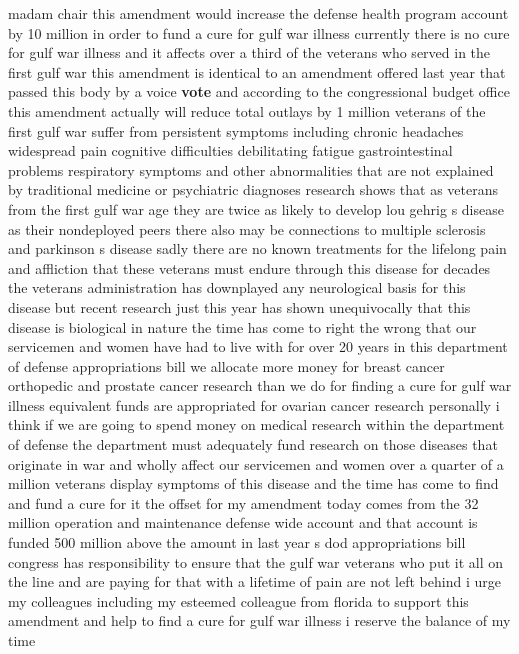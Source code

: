 \documentclass{article}
\begin{document}
\vspace{8mm}
madam chair this amendment would increase the defense health program account by 10 million in order to fund a cure for gulf war illness currently there is no cure for gulf war illness and it affects over a third of the veterans who served in the first gulf war this amendment is identical to an amendment offered last year that passed this body by a voice {\bf \color{red} vote} and according to the congressional budget office this amendment actually will reduce total outlays by 1 million veterans of the first gulf war suffer from persistent symptoms including chronic headaches widespread pain cognitive difficulties debilitating fatigue gastrointestinal problems respiratory symptoms and other abnormalities that are not explained by traditional medicine or psychiatric diagnoses research shows that as veterans from the first gulf war age they are twice as likely to develop lou gehrig s disease as their nondeployed peers there also may be connections to multiple sclerosis and parkinson s disease sadly there are no known treatments for the lifelong pain and affliction that these veterans must endure through this disease for decades the veterans administration has downplayed any neurological basis for this disease but recent research just this year has shown unequivocally that this disease is biological in nature the time has come to right the wrong that our servicemen and women have had to live with for over 20 years in this department of defense appropriations bill we allocate more money for breast cancer orthopedic and prostate cancer research than we do for finding a cure for gulf war illness equivalent funds are appropriated for ovarian cancer research personally i think if we are going to spend money on medical research within the department of defense the department must adequately fund research on those diseases that originate in war and wholly affect our servicemen and women over a quarter of a million veterans display symptoms of this disease and the time has come to find and fund a cure for it the offset for my amendment today comes from the 32 million operation and maintenance defense wide account and that account is funded 500 million above the amount in last year s dod appropriations bill congress has responsibility to ensure that the gulf war veterans who put it all on the line and are paying for that with a lifetime of pain are not left behind i urge my colleagues including my esteemed colleague from florida to support this amendment and help to find a cure for gulf war illness i reserve the balance of my time
\end{document}
